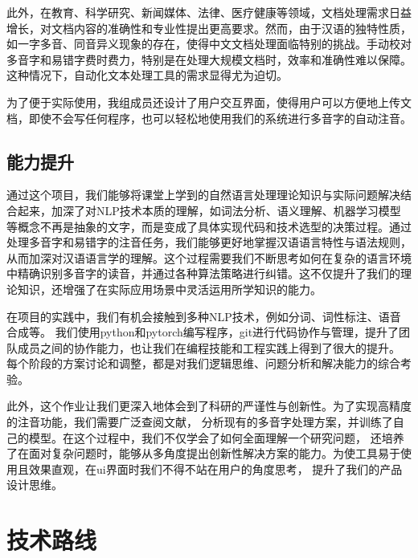 \documentclass[12pt,hyperref,a4paper,UTF8]{ctexart}
\begin{document}
此外，在教育、科学研究、新闻媒体、法律、医疗健康等领域，文档处理需求日益增长，对文档内容的准确性和专业性提出更高要求。然而，由于汉语的独特性质，如一字多音、同音异义现象的存在，使得中文文档处理面临特别的挑战。手动校对多音字和易错字费时费力，特别是在处理大规模文档时，效率和准确性难以保障。这种情况下，自动化文本处理工具的需求显得尤为迫切。

为了便于实际使用，我组成员还设计了用户交互界面，使得用户可以方便地上传文档，即使不会写任何程序，也可以轻松地使用我们的系统进行多音字的自动注音。
\subsection{能力提升}
通过这个项目，我们能够将课堂上学到的自然语言处理理论知识与实际问题解决结合起来，加深了对NLP技术本质的理解，如词法分析、语义理解、机器学习模型等概念不再是抽象的文字，而是变成了具体实现代码和技术选型的决策过程。通过处理多音字和易错字的注音任务，我们能够更好地掌握汉语语言特性与语法规则，从而加深对汉语语言学的理解。这个过程需要我们不断思考如何在复杂的语言环境中精确识别多音字的读音，并通过各种算法策略进行纠错。这不仅提升了我们的理论知识，还增强了在实际应用场景中灵活运用所学知识的能力。

在项目的实践中，我们有机会接触到多种NLP技术，例如分词、词性标注、语音合成等。
我们使用python和pytorch编写程序，git进行代码协作与管理，提升了团队成员之间的协作能力，也让我们在编程技能和工程实践上得到了很大的提升。
每个阶段的方案讨论和调整，都是对我们逻辑思维、问题分析和解决能力的综合考验。

此外，这个作业让我们更深入地体会到了科研的严谨性与创新性。为了实现高精度的注音功能，我们需要广泛查阅文献，
分析现有的多音字处理方案，并训练了自己的模型。在这个过程中，我们不仅学会了如何全面理解一个研究问题，
还培养了在面对复杂问题时，能够从多角度提出创新性解决方案的能力。为使工具易于使用且效果直观，在ui界面时我们不得不站在用户的角度思考，
提升了我们的产品设计思维。
\section{技术路线}
\end{document}
